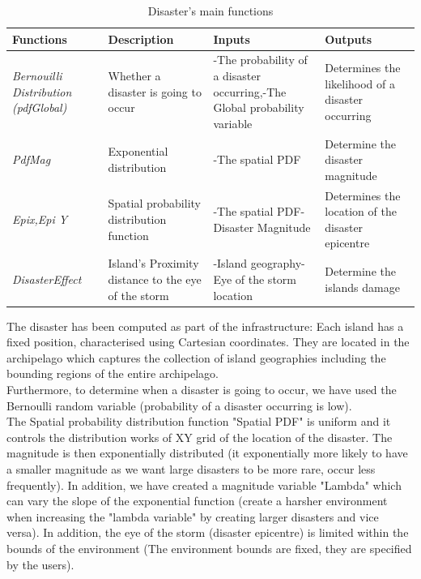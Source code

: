 \begin{table}[h]
\begin{center}
\begin{tabular}{|p{1.1in}|p{1.1in}|p{1.1in}|p{1.1in}|} \hline
\textbf{Functions} & \textbf{Description} & \textbf{Inputs} & \textbf{Outputs} \\ \hline
\textit{Bernouilli Distribution (pdfGlobal)} & Whether a disaster is going to occur & -The probability of a disaster occurring,\newline -The Global probability variable & Determines the likelihood of a disaster occurring \\ \hline
\textit{PdfMag} & Exponential distribution & -The spatial PDF & Determine the disaster magnitude \\ \hline
\textit{Epix,Epi Y} & Spatial probability distribution function & -The spatial PDF\newline -Disaster Magnitude & Determines the location of the disaster epicentre \\ \hline
\textit{DisasterEffect} & Island's Proximity distance to the eye of the storm & -Island geography\newline -Eye of the storm location & Determine the islands damage \\ \hline
\end{tabular}
\caption{\label{tab:table-name}Disaster's main functions}
\end{center}
\end{table}

The disaster has been computed as part of the infrastructure: Each island has a fixed position, characterised using Cartesian coordinates. They are located in the archipelago which captures the collection of island geographies including the bounding regions of the entire archipelago.\\

Furthermore, to determine when a disaster is going to occur, we have used the Bernoulli random variable (probability of a disaster occurring is low).\\

The Spatial probability distribution function "Spatial PDF" is uniform and it controls the distribution works of XY grid of the location of the disaster. The magnitude is then exponentially distributed (it exponentially more likely to have a smaller magnitude as we want large disasters to be more rare, occur less frequently). In addition, we have created a magnitude variable "Lambda" which can vary the slope of the exponential function (create a harsher environment when increasing the "lambda variable" by creating larger disasters and vice versa). In addition, the eye of the storm (disaster epicentre) is limited within the bounds of the environment (The environment bounds are fixed, they are specified by the users).\\

